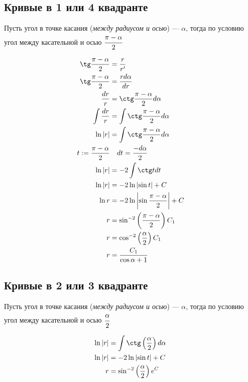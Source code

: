 \subsection{Кривые в 1 или 4 квадранте}

Пусть угол в точке касания (\textit{между радиусом и осью}) --- $\alpha$, тогда по условию угол между касательной и осью $\cfrac{\pi - \alpha}{2}$

\begin{align*}
    \tg \frac{\pi - \alpha}{2}  & = \frac{r}{r'}                                      \\
    \tg \frac{\pi - \alpha}{2}  & = \frac{rd\alpha}{dr}                               \\
    \frac{dr}{r}                & = \ctg \frac{\pi - \alpha}{2} d\alpha               \\
    \int \frac{dr}{r}           & = \int \ctg \frac{\pi - \alpha}{2} d\alpha          \\
    \ln |r|                     & = \int \ctg \frac{\pi - \alpha}{2} d\alpha          \\
    t := \frac{\pi - \alpha}{2} & \quad dt = \frac{-d\alpha}{2}                       \\
    \ln |r|                     & = -2\int \ctg t dt                                  \\
    \ln |r|                     & = -2\ln\left|\sin t\right| + C                      \\
    \ln r                       & = -2\ln\left|\sin \frac{\pi - \alpha}{2}\right| + C \\
    r                           & = \sin^{-2} \left(\frac{\pi - \alpha}{2}\right) C_1 \\
    r                           & = \cos^{-2} \left(\frac{\alpha}{2}\right) C_1       \\
    r                           & = \frac{C_1}{\cos \alpha + 1}                       \\
\end{align*}

\subsection{Кривые в 2 или 3 квадранте}

Пусть угол в точке касания (\textit{между радиусом и осью}) --- $\alpha$, тогда по условию угол между касательной и осью $\cfrac{\alpha}{2}$

\begin{align*}
    \ln |r| & = \int \ctg \left(\frac{\alpha}{2}\right) d\alpha \\
    \ln |r| & = -2\ln\left|\sin t\right| + C                    \\
    r       & = \sin^{-2} \left(\frac{\alpha}{2}\right) e^C     \\
\end{align*}

